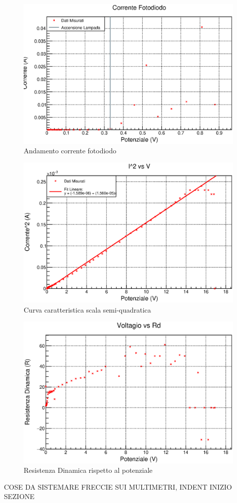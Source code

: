 \documentclass[a4paper]{article}
\begin{document}
\begin{figure}[!htbp]
      \includegraphics[width=\textwidth]{immagini/fotodiodografico.eps}
        \caption{Andamento corrente fotodiodo}
\end{figure}
\FloatBarrier

\begin{figure}[!htbp]
      \includegraphics[width=\textwidth]{immagini/I2vsV.eps}
        \caption{Curva caratteristica scala semi-quadratica}
\end{figure}
\FloatBarrier

\begin{figure}[!htbp]
      \includegraphics[width=\textwidth]{immagini/fotodiodord.eps}
        \caption{Resistenza Dinamica rispetto al potenziale}
\end{figure}
\FloatBarrier



\newpage
\huge{COSE DA SISTEMARE}
FRECCIE SUI MULTIMETRI, INDENT INIZIO SEZIONE
\end{document}
